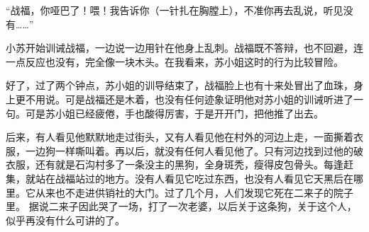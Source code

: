 “战福，你哑巴了！喂！我告诉你（一针扎在胸膛上），不准你再去乱说，听见没有……” 

小苏开始训诫战福，一边说一边用针在他身上乱刺。战福既不答辩，也不回避，连一点反应也没有，完全像一块木头。在我看来，苏小姐这时的行为比较冒险。 

好了，过了两个钟点，苏小姐的训导结束了，战福脸上也有十来处冒出了血珠，身上更不用说。可是战福还是木着，也没有任何迹象证明他对苏小姐的训诫听进了一句。可是苏小姐已经疲倦，手也酸得厉害，于是开开门，把他推了出去。 

后来，有人看见他默默地走过街头，又有人看见他在村外的河边上走，一面撕着衣服，一边狗一样嘶叫着。再以后，就没有任何人看见他了。只有河边找到过他的破衣服，还有就是石沟村多了一条没主的黑狗，全身斑秃，瘦得皮包骨头。每逢赶集，就站在战福站过的地方。没有人看见它吃过东西，也没有人看见它天黑后在哪里。它从来也不走进供销社的大门。过了几个月，人们发现它死在二来子的院子里。 据说二来子因此哭了一场，打了一次老婆，以后关于这条狗，关于这个人，似乎再没有什么可讲的了。
